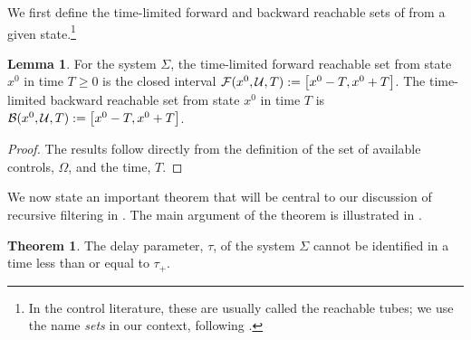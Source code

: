 \documentclass[letterpaper,10pt,conference]{ieeeconf}
\theoremstyle{definition}
\newtheorem{lemma}{Lemma}
\newtheorem{theorem}{Theorem}
\begin{document}
We first define the time-limited forward and backward reachable sets \cite{2006_LaValle_Planning,2017_Bansal_Hamilton-Jacobi} of  from a given state.\footnote{In the control literature, these are usually called the reachable tubes; we use the name \emph{sets} in our context, following \cite{2006_LaValle_Planning}.}

\begin{lemma}
\label{lem:fb_reachable}
For the system $\Sigma$, the time-limited forward reachable set from state $x^0$ in time $T \geq 0$ is the closed interval $\mathcal{F}(x^{0}, \mathcal{U}, T) := \left[x^{0} - T, x^{0} + T\right]$.
%
The time-limited backward reachable set from state $x^0$ in time $T$ is $\mathcal{B}(x^{0}, \mathcal{U}, T) := \left[x^{0} - T, x^{0} + T\right]$.
\end{lemma}

\begin{proof}
The results follow directly from the definition of the set of available controls, $\Omega$, and the time, $T$.
\end{proof}

We now state an important theorem that will be central to our discussion of recursive filtering in . 
%
The main argument of the theorem is illustrated in .

\begin{theorem}
\label{thm:tau_unobservable}
The delay parameter, $\tau$, of the system $\Sigma$ cannot be identified in a time less than or equal to $\tau_{+}$.
\end{theorem}
\end{document}
